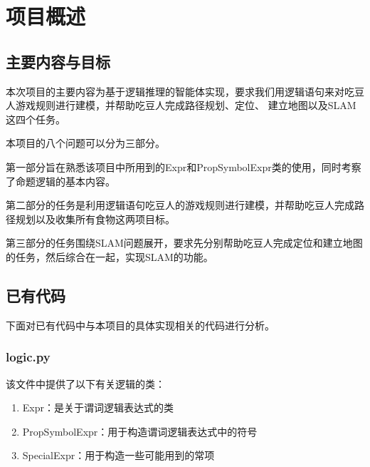 \chapter{项目概述}
\section{主要内容与目标}
本次项目的主要内容为基于逻辑推理的智能体实现，要求我们用逻辑语句来对吃豆人游戏规则进行建模，并帮助吃豆人完成路径规划、定位、
建立地图以及SLAM这四个任务。

本项目的八个问题可以分为三部分。

第一部分旨在熟悉该项目中所用到的Expr和PropSymbolExpr类的使用，同时考察了命题逻辑的基本内容。

第二部分的任务是利用逻辑语句吃豆人的游戏规则进行建模，并帮助吃豆人完成路径规划以及收集所有食物这两项目标。

第三部分的任务围绕SLAM问题展开，要求先分别帮助吃豆人完成定位和建立地图的任务，然后综合在一起，实现SLAM的功能。
\section{已有代码}
下面对已有代码中与本项目的具体实现相关的代码进行分析。
\subsection{logic.py}
该文件中提供了以下有关逻辑的类：
\begin{enumerate}
    \item Expr：是关于谓词逻辑表达式的类
    \item PropSymbolExpr：用于构造谓词逻辑表达式中的符号
    \item SpecialExpr：用于构造一些可能用到的常项
\end{enumerate}

